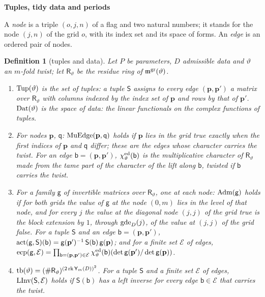 \documentclass[11pt,a4paper]{article}
\newcommand{\kw}[1]{\emph{#1}}
\newcommand{\sect}[2]{\refstepcounter{section}\label{#2}\par\addvspace{19pt plus 4pt minus 2pt}\Needspace{7\baselineskip}%
  \noindent\llap{{\fontsize{13.2}{16}\selectfont\bfseries\color{inkfaint}\thesection}\hspace{9pt}}%
  {\fontsize{13.2}{16}\selectfont\bfseries\color{ink}#1}\par\nopagebreak\vspace{-1pt}}
\theoremstyle{plainx}
\theoremstyle{uprightx}
\newtheorem{definition}[theorem]{Definition}
\newcommand{\sR}{\mathsf{R}}
\newcommand{\sS}{\mathsf{S}}
\newcommand{\sY}{\mathsf{Y}}
\newcommand{\sg}{\mathsf{g}}
\newcommand{\sq}{\mathsf{q}}
\newcommand{\cE}{\mathcal{E}}
\begin{document}
\sect{Tuples, tidy data and periods}{s:tidy}
A \kw{node} is a triple $(o,j,n)$ of a flag and two natural numbers; it stands for the node $(j,n)$ of the grid
$o$, with its index set and its space of forms. An \kw{edge} is an ordered pair of nodes.

\begin{definition}[tuples and data]\label{d:tuples}
Let $P$ be parameters, $D$ admissible data and $\vartheta$ an $m$-fold twist; let $\sR_\vartheta$ be the residue
ring of $\mathfrak{m}^{\mathrm{gr}}(\vartheta)$.
\begin{enumerate}[label=\textup{(\alph*)},leftmargin=2.3em,itemsep=1pt]
\item $\operatorname{Tup}(\vartheta)$ is the set of \kw{tuples}: a tuple $\sS$ assigns to every edge $(\mathbf{p},\mathbf{p}')$ a
matrix over $\sR_\vartheta$ with columns indexed by the index set of $\mathbf{p}$ and rows by that of $\mathbf{p}'$.
$\operatorname{Dat}(\vartheta)$ is the space of \kw{data}: the linear functionals on the complex functions of tuples.
\item For nodes $\mathbf{p}$, $\sq$: $\IsMuEdge{\mathbf{p}}{\sq}$ holds if $\mathbf{p}$ lies in the grid true exactly when the first
indices of $\mathbf{p}$ and $\sq$ differ; these are the edges whose character carries the twist. For an edge
$\mathsf{b}=(\mathbf{p},\mathbf{p}')$, $\chi^{\mathrm{ed}}_{\vartheta}(\mathsf{b})$ is the multiplicative character of $\sR_\vartheta$ made
from the tame part of the character of the lift along $\mathsf{b}$, twisted if $\mathsf{b}$ carries the twist.
\item For a family $\sg$ of invertible matrices over $\sR_\vartheta$, one at each node: $\IsAdmissibleFamily{\sg}$
holds if for both grids the value of $\sg$ at the node $(0,m)$ lies in the level of that node, and for every
$j$ the value at the diagonal node $(j,j)$ of the grid true is the block extension by $1$, through
$\operatorname{gde}_{D}(j)$, of the value at $(j,j)$ of the grid false. For a tuple $\sS$ and an edge
$\mathsf{b}=(\mathbf{p},\mathbf{p}')$, $\tupleAction{\sg}{\sS}{\mathsf{b}}=\sg(\mathbf{p}')^{-1}\,\sS(\mathsf{b})\,\sg(\mathbf{p})$; and for a
finite set $\cE$ of edges,
$\edgeCharProd{\sg}{\cE}=\prod_{\mathsf{b}=(\mathbf{p},\mathbf{p}')\in\cE}\edgeChar{\vartheta}{\mathsf{b}}(\det\sg(\mathbf{p}')/\det\sg(\mathbf{p}))$.
\item $\tupleBound{\vartheta}=(\#\sR_\vartheta)^{(2\operatorname{rk}\sY_m(D))^2}$. For a tuple $\sS$ and a finite
set $\cE$ of edges, $\LeftInvOnMuEdges{\sS}{\cE}$ holds if $\sS(\mathsf{b})$ has a left inverse for every edge
$\mathsf{b}\in\cE$ that carries the twist.

\end{enumerate}
\end{definition}
\end{document}
